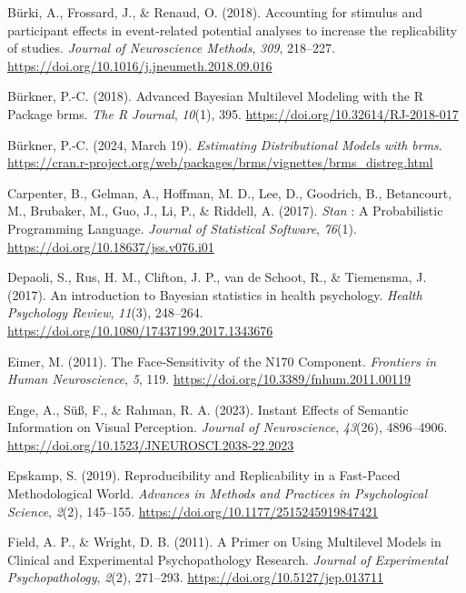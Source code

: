 \documentclass[
  doc,12pt,floatsintext]{apa7}
\newlength{\cslhangindent}
\newenvironment{CSLReferences}[2] %
 {\begin{list}{}{%
  \setlength{\itemindent}{0pt}
  \setlength{\leftmargin}{0pt}
  \setlength{\parsep}{0pt}
  \ifodd #1
   \setlength{\leftmargin}{\cslhangindent}
   \setlength{\itemindent}{-1\cslhangindent}
  \fi
  \setlength{\itemsep}{#2\baselineskip}}}
 {\end{list}}
\begin{document}
\begin{CSLReferences}{1}{0}
Bürki, A., Frossard, J., \& Renaud, O. (2018). Accounting for stimulus and participant effects in event-related potential analyses to increase the replicability of studies. \emph{Journal of Neuroscience Methods}, \emph{309}, 218--227. \url{https://doi.org/10.1016/j.jneumeth.2018.09.016}

Bürkner, P.-C. (2018). Advanced {Bayesian Multilevel Modeling} with the {R Package} brms. \emph{The R Journal}, \emph{10}(1), 395. \url{https://doi.org/10.32614/RJ-2018-017}

Bürkner, P.-C. (2024, March 19). \emph{Estimating {Distributional Models} with brms}. \url{https://cran.r-project.org/web/packages/brms/vignettes/brms_distreg.html}

Carpenter, B., Gelman, A., Hoffman, M. D., Lee, D., Goodrich, B., Betancourt, M., Brubaker, M., Guo, J., Li, P., \& Riddell, A. (2017). \emph{Stan} : {A Probabilistic Programming Language}. \emph{Journal of Statistical Software}, \emph{76}(1). \url{https://doi.org/10.18637/jss.v076.i01}

Depaoli, S., Rus, H. M., Clifton, J. P., van de Schoot, R., \& Tiemensma, J. (2017). An introduction to {Bayesian} statistics in health psychology. \emph{Health Psychology Review}, \emph{11}(3), 248--264. \url{https://doi.org/10.1080/17437199.2017.1343676}

Eimer, M. (2011). The {Face-Sensitivity} of the {N170 Component}. \emph{Frontiers in Human Neuroscience}, \emph{5}, 119. \url{https://doi.org/10.3389/fnhum.2011.00119}

Enge, A., Süß, F., \& Rahman, R. A. (2023). Instant {Effects} of {Semantic Information} on {Visual Perception}. \emph{Journal of Neuroscience}, \emph{43}(26), 4896--4906. \url{https://doi.org/10.1523/JNEUROSCI.2038-22.2023}

Epskamp, S. (2019). Reproducibility and {Replicability} in a {Fast-Paced Methodological World}. \emph{Advances in Methods and Practices in Psychological Science}, \emph{2}(2), 145--155. \url{https://doi.org/10.1177/2515245919847421}

Field, A. P., \& Wright, D. B. (2011). A {Primer} on {Using Multilevel Models} in {Clinical} and {Experimental Psychopathology Research}. \emph{Journal of Experimental Psychopathology}, \emph{2}(2), 271--293. \url{https://doi.org/10.5127/jep.013711}


\end{CSLReferences}
\end{document}
